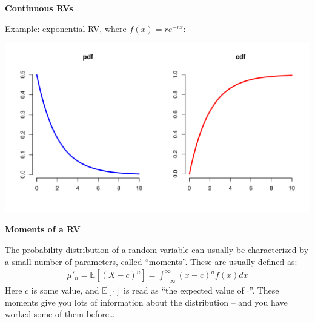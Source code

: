 \documentclass[12pt,xcolor=svgnames]{beamer}
\newcommand{\theme}{\color{FireBrick}}
\newcommand{\ds}[1]{\mathds{#1}}
\newcommand{\sk}{\vspace{.4cm}}
\newcommand{\chap}[1]{{\theme \Large \bf #1} \sk}
\newcommand{\E}{\ds{E}}
\begin{document}
\begin{frame}
\chap{Continuous RVs}

Example: exponential RV, where $f(x) = re^{-rx}$:

\begin{center}
\includegraphics[scale=0.4,trim=10 20 0 10]{continuousRVs}
\end{center}

\end{frame}
%
%
%
%


\begin{frame}
\chap{Moments of a RV}

The probability distribution of a random variable can usually be characterized by a small number of parameters, called ``moments''. These are usually defined as:
\begin{align*}
\mu'_n = \E[(X-c)^n] = \int_{-\infty}^{\infty} (x-c)^n f(x) dx
\end{align*}
Here $c$ is some value, and $\E[\cdot]$ is read as ``the expected value of $\cdot$''.  These moments give you lots of information about the distribution -- and you have worked some of them before\dots
\end{frame}
\end{document}
